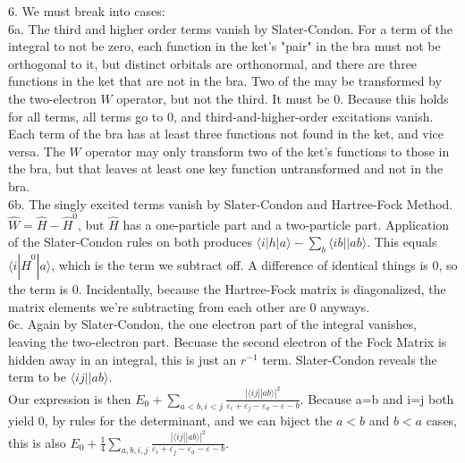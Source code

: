 \documentclass{article}
\begin{document}
6. We must break into cases:\\
6a. The third and higher order terms vanish by Slater-Condon. For a term of the integral to not be zero, each function in the ket's "pair" in the bra must not be orthogonal to it, but distinct orbitals are orthonormal, and there are three functions in the ket that are not in the bra. Two of the may be transformed by the two-electron $W$ operator, but not the third. It must be 0. Because this holds for all terms, all terms go to 0, and third-and-higher-order excitations vanish.\\
Each term of the bra has at least three functions not found in the ket, and vice versa. The $W$ operator may only transform two of the ket's functions to those in the bra, but that leaves at least one key function untransformed and not in the bra.\\
6b. The singly excited terms vanish by Slater-Condon and Hartree-Fock Method. $\hat{W}=\hat{H}-\hat{H}^0$, but $\hat{H}$ has a one-particle part and a two-particle part. Application of the Slater-Condon rules on both produces $\langle i | h | a \rangle - \sum_b \langle ib || ab \rangle$. This equals $\langle i | \hat{H}^0 | a\rangle$, which is the term we subtract off. A difference of identical things is 0, so the term is 0. Incidentally, because the Hartree-Fock matrix is diagonalized, the matrix elements we're subtracting from each other are 0 anyways.\\
6c. Again by Slater-Condon, the one electron part of the integral vanishes, leaving the two-electron part. Becuase the second electron of the Fock Matrix is hidden away in an integral, this is just an $r^{-1}$ term. Slater-Condon reveals the term to be $\langle ij || ab \rangle$.\\

Our expression is then $E_0 + \sum\limits_{a<b, i<j} \frac{|\langle ij||ab \rangle |^2}{\varepsilon_i + \varepsilon_j - \varepsilon_a - \varepsilon-b}$. Because a=b and i=j both yield 0, by rules for the determinant, and we can biject the $a<b$ and $b<a$ cases, this is also $E_0 + \frac{1}{4} \sum\limits_{a,b,i,j} \frac{|\langle ij||ab \rangle |^2}{\varepsilon_i + \varepsilon_j - \varepsilon_a - \varepsilon-b}$.
\end{document}
